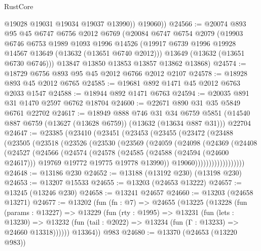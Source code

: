 \begin{lexlean}{RustCore}
\begin{coremodule}
            @19028
            @19031
            @19034
            @19037
            @13990))
        @19060))
@24566 := @20074
    @893
    @95
    @45
    @6747
    @6756
    @2012
    @6769
    (@20084
      @6747
      @6754
      @2079
      (@19903
        @6746
        @6753
        @1989
        @1093
        @1996
        @14526
        (@19917 @6739 @1996 @19928 @14567 @13649 (@13632 (@13651 @6740 @2012)))
        @13649
        (@13632 (@13651 @6730 @6746)))
      @13847
      @13850
      @13853
      @13857
      @13862
      @13868)
@24574 := @18729 @6756 @893 @95 @45 @2012 @6766 @2012 @2107
@24578 := @18928 @893 @45 @2012 @6765
@24585 := @19681 @892 @1471 @45 @2012 @6763 @2033 @1547
@24588 := @18944 @892 @1471 @6763
@24594 := @20035 @891 @31 @1470 @2597 @6762 @18704
@24600 := @22671 @890 @31 @35 @5849 @6761 @22702
@24617 := @18949
    @888
    @746
    @31
    @34
    @6759
    @5851
    (@14540 @887 @6759 (@13627 (@13628 @6759)) (@13632 (@13634 @887 @31)))
    @22704
@24647 := @23385
    (@23410
      (@23451
        (@23453
          (@23455
            (@23472
              (@23488
                (@23505
                  (@23518
                    (@23526
                      (@23530
                        (@23569
                          (@24059
                            (@24098
                              (@24369
                                (@24408
                                  (@24527
                                    (@24566
                                      (@24574
                                        (@24578
                                          (@24585
                                            (@24588 (@24594 (@24600 @24617)))
                                            @19769
                                            @19772
                                            @19775
                                            @19778
                                            @13990))
                                        @19060))))))))))))))))))
@24648 := @13186 @230
@24652 := @13188 (@13192 @230) (@13198 @230)
@24653 := @13207 @15533
@24655 := @13203 (@24653 @13222)
@24657 := @13245 (@13246 @230)
@24658 := @13241 @24657
@24660 := @13203 (@24658 @13271)
@24677 := @13202
    (fun (fn : @7) =>
    @24655
      (@13225
        (@13228
          (fun (params : @13227) =>
          @13229
            (fun (rty : @1995) =>
            @13231
              (fun (lets : @13230) =>
              @13232 (fun (tail : @2022) => @13234 (fun (Γ : @13233) => @24660 @13318))))))
        @13364))
    @983
@24680 := @13370 (@24653 (@13220 @983))

\end{coremodule}
\end{lexlean}

